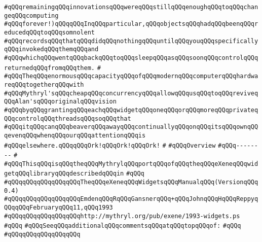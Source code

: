 \verb|#qQQqremainingqQQqinnovationsqQQqwereqQQqstillqQQqenoughqQQqtoqQQqchangeqQQqcomputing|\newline
\verb|#qQQqforever!)qQQqqQQqInqQQqparticular,qQQqobjectsqQQqhadqQQqbeenqQQqreducedqQQqtoqQQqsomnolent|\newline
\verb|#qQQqrecordsqQQqthatqQQqdidqQQqnothingqQQquntilqQQqyouqQQqspecificallyqQQqinvokedqQQqthemqQQqand|\newline
\verb|#qQQqwhichqQQqwentqQQqbackqQQqtoqQQqsleepqQQqasqQQqsoonqQQqcontrolqQQqreturnedqQQqfromqQQqthem.|\newline
\verb|#|\newline
\verb|#qQQqTheqQQqenormousqQQqcapacityqQQqofqQQqmodernqQQqcomputerqQQqhardwareqQQqtogetherqQQqwith|\newline
\verb|#qQQqMythryl'sqQQqcheapqQQqconcurrencyqQQqallowqQQqusqQQqtoqQQqreviveqQQqAlan'sqQQqoriginalqQQqvision|\newline
\verb|#qQQqbyqQQqgrantingqQQqeachqQQqwidgetqQQqoneqQQqorqQQqmoreqQQqprivateqQQqcontrolqQQqthreadsqQQqsoqQQqthat|\newline
\verb|#qQQqitqQQqcanqQQqbeaverqQQqawayqQQqcontinuallyqQQqonqQQqitsqQQqownqQQqevenqQQqwhenqQQqourqQQqattentionqQQqis|\newline
\verb|#qQQqelsewhere.qQQqqQQqOrk!qQQqOrk!qQQqOrk!|\newline
\verb|#|\newline
\verb|#qQQqOverview|\newline
\verb|#qQQq--------|\newline
\verb|#|\newline
\verb|#qQQqThisqQQqisqQQqtheqQQqMythrylqQQqportqQQqofqQQqtheqQQqeXeneqQQqwidgetqQQqlibraryqQQqdescribedqQQqin|\newline
\verb|#qQQq|\newline
\verb|#qQQqqQQqqQQqqQQqqQQqTheqQQqeXeneqQQqWidgetsqQQqManualqQQq(VersionqQQq0.4)|\newline
\verb|#qQQqqQQqqQQqqQQqqQQqEmdenqQQqRqQQqGansnerqQQq+qQQqJohnqQQqHqQQqReppyqQQqqQQqFebruaryqQQq11,qQQq1993|\newline
\verb|#qQQqqQQqqQQqqQQqqQQqhttp://mythryl.org/pub/exene/1993-widgets.ps|\newline
\verb|#qQQq|\newline
\verb|#qQQqSeeqQQqadditionalqQQqcommentsqQQqatqQQqtopqQQqof:|\newline
\verb|#qQQq|\newline
\verb|#qQQqqQQqqQQqqQQqqQQq|\newline
